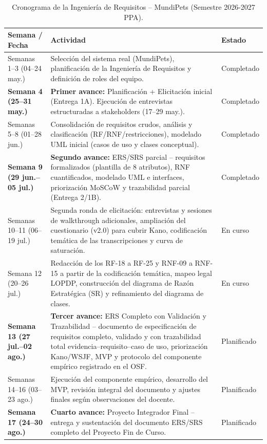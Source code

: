 \documentclass[journal,onecolumn]{IEEEtran}
\begin{document}
	\begin{table}[H]
		\caption{Cronograma de la Ingeniería de Requisitos -- MundiPets (Semestre 2026-2027 PPA).}
		\centering
		
		\begin{tabularx}{\linewidth}{|C{2.5cm}|X|C{2.8cm}|}
			\hline
			\textbf{Semana / Fecha} & \textbf{Actividad} & \textbf{Estado} \\
			\hline
			Semanas 1--3 (04--24 may.) & Selección del sistema real (MundiPets), planificación de la Ingeniería de Requisitos y definición de roles del equipo. & Completado \\
			\hline
			\textbf{Semana 4 (25--31 may.)} & \textbf{Primer avance:} Planificación + Elicitación inicial (Entrega 1A). Ejecución de entrevistas estructuradas a stakeholders (17--29 may.). & Completado \\
			\hline
			Semanas 5--8 (01--28 jun.) & Consolidación de requisitos crudos, análisis y clasificación (RF/RNF/restricciones), modelado UML inicial (casos de uso y clases conceptual). & Completado \\
			\hline
			\textbf{Semana 9 (29 jun.--05 jul.)} & \textbf{Segundo avance:} ERS/SRS parcial -- requisitos formalizados (plantilla de 8 atributos), RNF cuantificados, modelado UML e interfaces, priorización MoSCoW y trazabilidad parcial (Entrega 2/1B). & Completado \\
			\hline
			Semanas 10--11 (06--19 jul.) & Segunda ronda de elicitación: entrevistas y sesiones de walkthrough adicionales, ampliación del cuestionario (v2.0) para cubrir Kano, codificación temática de las transcripciones y curva de saturación. & En curso \\
			\hline
			Semana 12 (20--26 jul.) & Redacción de los RF-18 a RF-25 y RNF-09 a RNF-15 a partir de la codificación temática, mapeo legal LOPDP, construcción del diagrama de Razón Estratégica (SR) y refinamiento del diagrama de clases. & En curso \\
			\hline
			\textbf{Semana 13 (27 jul.--02 ago.)} & \textbf{Tercer avance:} ERS Completo con Validación y Trazabilidad -- documento de especificación de requisitos completo, validado y con trazabilidad total evidencia--requisito--caso de uso, priorización Kano/WSJF, MVP y protocolo del componente empírico registrado en el OSF. & Planificado \\
			\hline
			Semanas 14--16 (03--23 ago.) & Ejecución del componente empírico, desarrollo del MVP, revisión integral del documento y ajustes finales según observaciones del docente. & Planificado \\
			\hline
			\textbf{Semana 17 (24--30 ago.)} & \textbf{Cuarto avance:} Proyecto Integrador Final -- entrega y sustentación del documento ERS/SRS completo del Proyecto Fin de Curso. & Planificado \\
			\hline
		\end{tabularx}
	\end{table}
	
\end{document}
